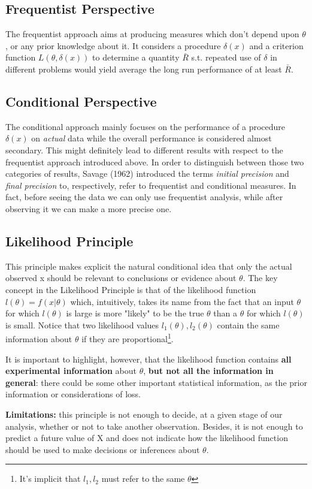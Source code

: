 \documentclass{article}
\begin{document}
	\subsection{Frequentist Perspective}
	The frequentist approach aims at producing measures which don't depend upon $\theta$, or any prior knowledge about it. It considers a procedure $\delta(x)$ and a criterion function $L(\theta, \delta(x))$ to determine a quantity $\bar{R}$ s.t. repeated use of $\delta$ in different problems would yield average the long run performance of at least $\bar{R}$.

	
	\subsection{Conditional Perspective}
	The conditional approach mainly focuses on the performance of a procedure $\delta(x)$  on \textit{actual} data while the overall performance is considered almost secondary. This  might definitely lead to different results with respect to the frequentist approach introduced above. In order to distinguish between
	those two categories of results, Savage (1962) introduced the terms \textit{initial precision} and \textit{final precision} to, respectively, refer to frequentist and conditional measures. In fact, before seeing the data we can only use frequentist analysis, while after observing it we can make a more precise one.
	

	\subsection{Likelihood Principle}
	This principle makes explicit the natural conditional idea that only the actual
	observed x should be relevant to conclusions or evidence about $\theta$. The key concept in the Likelihood Principle is that of the likelihood function $l(\theta) = f(x | \theta)$ which, intuitively, takes its name from the fact that an input $\theta$ for which $l(\theta)$ is large is more "likely" to be the true $\theta$ than a $\theta$ for which $l(\theta)$ is small.
	Notice that two likelihood values $l_1(\theta), l_2(\theta)$ contain the same information about $\theta$ if they are proportional\footnote{It's implicit that $l_1, l_2$ must refer to the same $\theta$}.
	
	It is important to highlight, however, that the likelihood function contains \textbf{all experimental information} about $\theta$,\textbf{ but not all the information in general}: there could be some other important statistical information, as the
	prior information or considerations of loss. 
	
	\textbf{Limitations:} this principle is not
	enough to decide, at a given stage of our analysis, whether or not to take another observation.
	Besides, it is not enough to predict a future value of X and does not indicate how the likelihood function should be used to make decisions or inferences about $\theta$.
	
\end{document}
